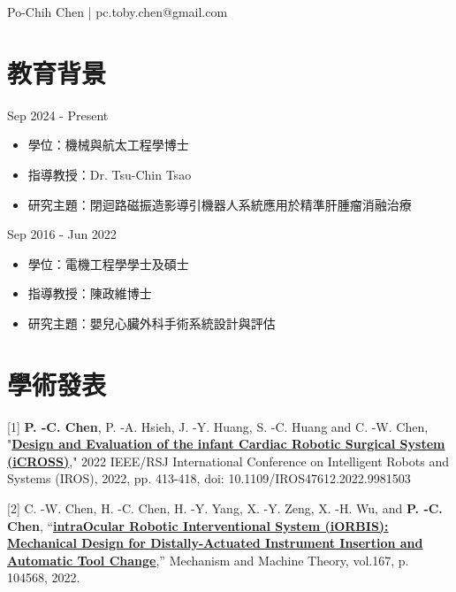 \documentclass{resume}
\begin{document}


\begin{center}
Po-Chih Chen \enspace | \enspace pc.toby.chen@gmail.com \\
\end{center}

\section{教育背景}
 {\small{Sep 2024 - Present}}
\begin{itemize}
    \item 學位：機械與航太工程學博士
    \item 指導教授：Dr. Tsu-Chin Tsao
    \item 研究主題：閉迴路磁振造影導引機器人系統應用於精準肝腫瘤消融治療
\end{itemize}

 {\small{Sep 2016 - Jun 2022}}
\begin{itemize}
    \item 學位：電機工程學學士及碩士
    \item 指導教授：陳政維博士
    \item 研究主題：嬰兒心臟外科手術系統設計與評估
\end{itemize}

\section{學術發表}
[1] \textbf{P. -C. Chen}, P. -A. Hsieh, J. -Y. Huang, S. -C. Huang and C. -W. Chen, "\href{https://ieeexplore.ieee.org/document/9981503}{\textbf{Design and Evaluation of the infant Cardiac Robotic Surgical System (iCROSS)}}," 2022 IEEE/RSJ International Conference on Intelligent Robots and Systems (IROS), 2022, pp. 413-418, doi: 10.1109/IROS47612.2022.9981503

[2] C. -W. Chen, H. -C. Chen, H. -Y. Yang, X. -Y. Zeng, X. -H. Wu, and \textbf{P. -C. Chen}, “\href{https://www.sciencedirect.com/science/article/pii/S0094114X21003128}{\textbf{intraOcular Robotic Interventional System (iORBIS): Mechanical Design for Distally-Actuated Instrument Insertion and Automatic Tool Change}},” Mechanism and Machine Theory, vol.167, p. 104568, 2022.
\end{document}

